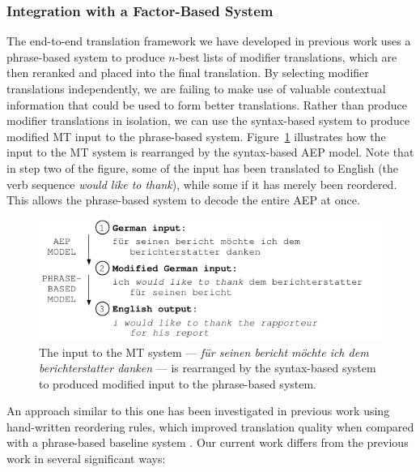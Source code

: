 \documentclass[10pt]{report}
\theoremstyle{plain}
\begin{document}
{\subsubsection{Integration with a Factor-Based System}
The end-to-end translation framework we have developed in previous
work uses a phrase-based system to produce $n$-best lists of modifier
translations, which are then reranked and placed into the final
translation. By selecting modifier translations independently, we are
failing to make use of valuable contextual information that could be
used to form better translations.  Rather than produce modifier
translations in isolation, we can use the syntax-based system to
produce modified MT input to the phrase-based
system. Figure~\ref{modifiedinput} illustrates how the input to the MT
system is rearranged by the syntax-based AEP model. Note that in step
two of the figure, some of the input has been translated to English
(the verb sequence {\em would like to thank}), while some if it has
merely been reordered. This allows the phrase-based system to decode
the entire AEP at once.

\begin{figure}
\begin{center}
\includegraphics[scale=1.2]{brooke-modifiedinput2}
\end{center}
\vspace{-0.5cm}
\caption{The input to the MT system --- {\em f\"{u}r seinen bericht
m\"{o}chte ich dem berichterstatter danken} --- is rearranged by the
syntax-based system to produced modified input to the phrase-based
system.}
\label{modifiedinput}
\end{figure}

An approach similar to this one has been investigated in previous work
using hand-written reordering rules, which improved translation
quality when compared with a phrase-based baseline system
. Our current work differs from the previous work in
several significant ways:

}
\end{document}
